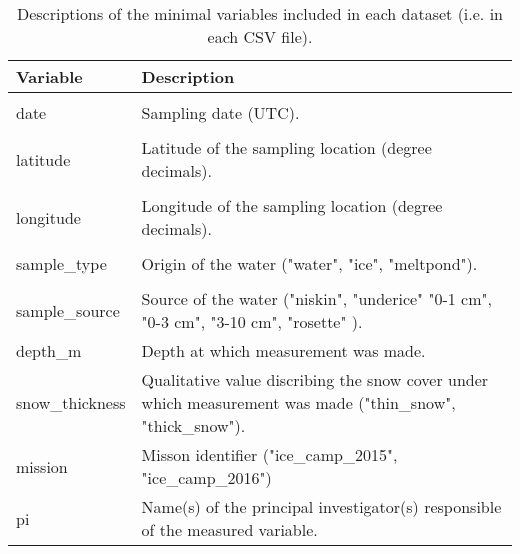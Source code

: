 \begin{table}[!htb]
	\centering
	\begin{tabular}{l L{12cm}}
		\toprule
		\textbf{Variable} & \textbf{Description}                                                                                        \\
		\toprule                                                                                                                        \\
		date              & Sampling date (UTC).                                                                                        \\
		\hline                                                                                                                          \\
		latitude          & Latitude of the sampling location (degree decimals).                                                        \\
		\hline                                                                                                                          \\
		longitude         & Longitude of the sampling location (degree decimals).                                                       \\
		\hline                                                                                                                          \\
		sample\_type      & Origin of the water ("water", "ice", "meltpond").                                                           \\
		\hline                                                                                                                          \\
		sample\_source    & Source of the water ("niskin", "underice" "0-1 cm", "0-3 cm", "3-10 cm", "rosette" ).                       \\
		\hline
		depth\_m          & Depth at which measurement was made.                                                                        \\
		\hline
		snow\_thickness   & Qualitative value discribing the snow cover under which measurement was made ("thin\_snow", "thick\_snow"). \\
		\hline
		mission           & Misson identifier ("ice\_camp\_2015", "ice\_camp\_2016")                                                    \\
		\hline
		pi                & Name(s) of the principal investigator(s) responsible of the measured variable.                              \\
		\bottomrule
	\end{tabular}
	\caption{Descriptions of the minimal variables included in each dataset (i.e. in each CSV file).}
\end{table}